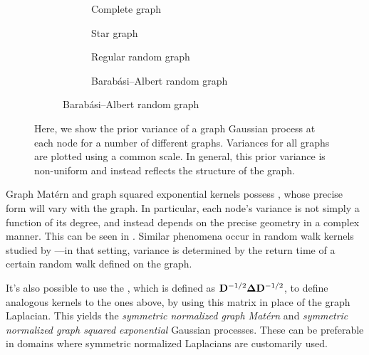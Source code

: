 \documentclass[11pt]{book}
\begin{document}
\begin{figure}
\begin{subfigure}{0.05\textwidth}

\end{subfigure}
\begin{subfigure}{0.94\textwidth}
\begin{subfigure}{0.49\textwidth}

\caption{Complete graph}
\end{subfigure}
\begin{subfigure}{0.49\textwidth}

\caption{Star graph}
\end{subfigure}
\begin{subfigure}{0.49\textwidth}

\caption{Regular random graph}
\end{subfigure}
\begin{subfigure}{0.49\textwidth}

\caption{Barabási--Albert random graph}
\end{subfigure}
\end{subfigure}
\caption[Graph Matérn kernels]{Here, we show the prior variance of a graph Gaussian process at each node for a number of different graphs. Variances for all graphs are plotted using a common scale. In general, this prior variance is non-uniform and instead reflects the structure of the graph.}
\label{fig:graph-variance}
\end{figure}

Graph Matérn and graph squared exponential kernels possess , whose precise form will vary with the graph.
In particular, each node's variance is not simply a function of its degree, and instead depends on the precise geometry in a complex manner.
This can be seen in .
Similar phenomena occur in random walk kernels studied by \textcite{urry13}---in that setting, variance is determined by the return time of a certain random walk defined on the graph.

It's also possible to use the , which is defined as $\m{D}^{-1/2}\m\lap\m{D}^{-1/2}$, to define analogous kernels to the ones above, by using this matrix in place of the graph Laplacian.
This yields the \emph{symmetric normalized graph Matérn} and \emph{symmetric normalized graph squared exponential} Gaussian processes.
These can be preferable in domains where symmetric normalized Laplacians are customarily used.
\end{document}
